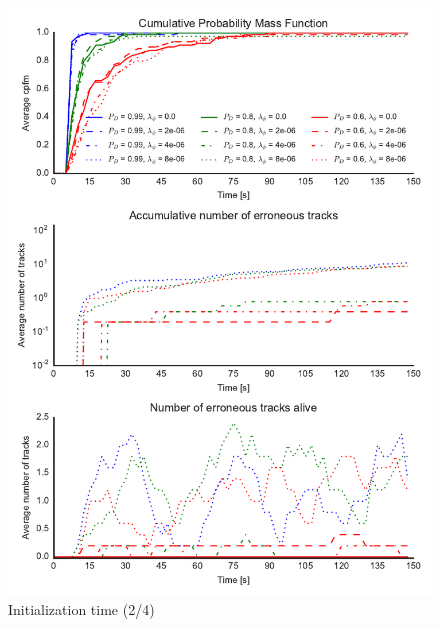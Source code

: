 \begin{figure}
\centering
\includegraphics{Figures/plots/Scenario0_Init-Time(2-4).pdf}
\caption{Initialization time (2/4)}\label{fig:init_time_2-4}
\end{figure}

